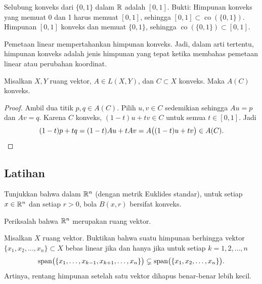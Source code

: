 \begin{example}
Selubung konveks dari $\{ 0, 1 \}$ dalam ${\mathbb{R}}$ adalah $[0,1]$.  Bukti:
Himpunan konveks yang memuat 0 dan 1 harus memuat $[0,1]$, sehingga
$[0,1] \subset \operatorname{co}(\{0,1\})$.
Himpunan $[0,1]$ konveks dan memuat $\{0,1\}$, sehingga
$\operatorname{co}(\{0,1\}) \subset [0,1]$.
\end{example}

Pemetaan linear mempertahankan himpunan konveks.  Jadi, dalam arti tertentu, himpunan
konveks adalah jenis himpunan yang tepat ketika membahas pemetaan linear atau perubahan
koordinat.

\begin{prop}
Misalkan $X,Y$ ruang vektor, $A \in L(X,Y)$, dan $C \subset X$ konveks.
Maka $A(C)$ konveks.
\end{prop}

\begin{proof}
Ambil dua titik $p,q \in A(C)$.  Pilih $u,v \in C$ sedemikian sehingga
$Au = p$ dan $Av=q$.  Karena $C$ konveks,
$(1-t)u+t v \in C$
untuk semua $t \in [0,1]$.  Jadi
\begin{equation*}
(1-t)p+t q 
=
(1-t)Au+tAv
=
A\bigl((1-t)u+tv\bigr)
\in A(C) .  \qedhere
\end{equation*}
\end{proof}


\subsection{Latihan}

\begin{exercise}
Tunjukkan bahwa dalam ${\mathbb{R}}^n$
(dengan metrik Euklides standar),
untuk setiap $x \in {\mathbb{R}}^n$ dan setiap $r > 0$,
bola $B(x,r)$ bersifat konveks.
\end{exercise}


\begin{exercise}
Periksalah bahwa ${\mathbb{R}}^n$ merupakan ruang vektor.
\end{exercise}

\begin{exercise}
Misalkan $X$ ruang vektor.
Buktikan bahwa suatu himpunan berhingga vektor $\{ x_1,x_2,\ldots,x_n \} \subset X$
bebas linear jika dan hanya jika untuk setiap $k=1,2,\ldots,n$
\begin{equation*}
\operatorname{span}\bigl( \{ x_1,\ldots,x_{k-1},x_{k+1},\ldots,x_n \}\bigr) \subsetneq
\operatorname{span}\bigl( \{ x_1,x_2,\ldots,x_n \}\bigr) .
\end{equation*}
Artinya, rentang himpunan setelah satu vektor dihapus benar-benar lebih kecil.
\end{exercise}

